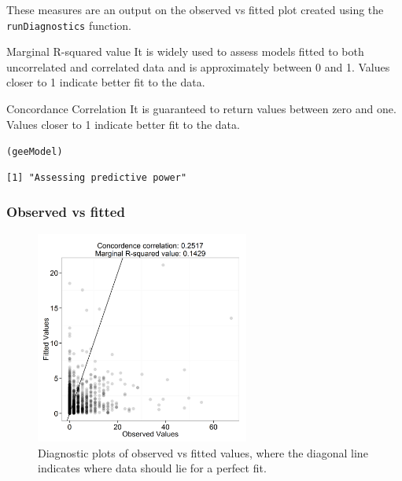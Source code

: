 \begin{frame}[fragile]
These measures are an output on the observed vs fitted plot created using the {\tt runDiagnostics} function. 

\begin{block}{Marginal R-squared value}
It is widely used to assess models fitted to both uncorrelated and correlated data and is approximately between 0 and 1.  Values closer to 1 indicate better fit to the data.
\end{block}

\begin{block}{Concordance Correlation}
It is guaranteed to return values between zero and one.  Values closer to 1 indicate better fit to the data.
\end{block}

\begin{knitrout}\footnotesize
{}\color{fgcolor}\begin{kframe}
\begin{alltt}
(geeModel)
\end{alltt}
\begin{verbatim}
[1] "Assessing predictive power"
\end{verbatim}
\end{kframe}
\end{knitrout}

\end{frame}

\begin{frame}[fragile]
\frametitle{Observed vs fitted}
\begin{figure}[h]
  \centering
    \includegraphics[width=7cm]{danish/FitPlots_fitted.png}
  \caption{Diagnostic plots of observed vs fitted values, where the diagonal line indicates where data should lie for a perfect fit.}
  \label{fig:diagplots}
\end{figure}
\end{frame}

